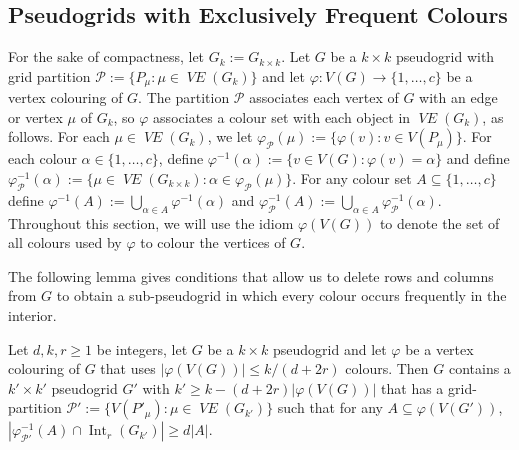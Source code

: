 \documentclass{patmorin}
\DeclareMathOperator{\interior}{Int}
\DeclareMathOperator{\VE}{\mathit{VE}}
\begin{document}
\subsection{Pseudogrids with Exclusively Frequent Colours}
\label{only_frequent_sec}

For the sake of compactness, let $G_k:=G_{k\times k}$.
Let $G$ be a $k\times k$ pseudogrid with grid partition $\mathcal{P}:=\{P_\mu:\mu\in\VE(G_{k})\}$ and let $\varphi:V(G)\to\{1,\ldots,c\}$ be a vertex colouring of $G$.  The partition $\mathcal{P}$ associates each vertex of $G$ with an edge or vertex $\mu$ of $G_k$, so $\varphi$ associates a colour set with each object in $\VE(G_k)$, as follows.  For each $\mu\in\VE(G_{k})$, we let $\varphi_{\mathcal{P}}(\mu):=\{\varphi(v):v\in V(P_\mu)\}$.  For each colour $\alpha\in\{1,\ldots,c\}$, define $\varphi^{-1}(\alpha):=\{v\in V(G):\varphi(v)=\alpha\}$ and define $\varphi_\mathcal{P}^{-1}(\alpha):=\{\mu\in \VE(G_{k\times k}):\alpha\in\varphi_\mathcal{P}(\mu)\}$.  For any colour set $A\subseteq\{1,\ldots,c\}$ define $\varphi^{-1}(A):=\bigcup_{\alpha\in A}\varphi^{-1}(\alpha)$ and $\varphi_\mathcal{P}^{-1}(A):=\bigcup_{\alpha\in A}\varphi_{\mathcal{P}}^{-1}(\alpha)$.  Throughout this section, we will use the idiom $\varphi(V(G))$ to denote the set of all colours used by $\varphi$ to colour the vertices of $G$.

The following lemma gives conditions that allow us to delete rows and columns from $G$ to obtain a sub-pseudogrid in which every colour occurs frequently in the interior.


\begin{lem}\label{only_frequent}
  Let $d,k,r\ge 1$ be integers, let $G$ be a $k\times k$ pseudogrid and let $\varphi$ be a vertex colouring of $G$ that uses $|\varphi(V(G))|\le k/(d+2r)$ colours.
  Then $G$ contains a $k'\times k'$ pseudogrid $G'$ with $k'\ge k - (d+2r)|\varphi(V(G))|$ that has a grid-partition $\mathcal{P}':=\{V(P'_\mu):\mu\in \VE(G_{k'})\}$ such that
  for any $A\subseteq \varphi(V(G'))$, $|\varphi_{\mathcal{P}'}^{-1}(A)\cap \interior_r(G_{k'})| \ge d|A|$.
\end{lem}
\end{document}
